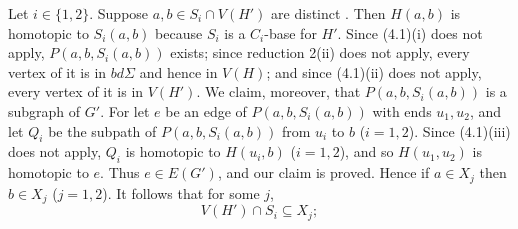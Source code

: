 Let $i \in \{1, 2\}$. Suppose $a, b \in S_i \cap V(H')$ are distinct . Then $H(a, b)$ is homotopic to $S_i(a, b)$ because $S_i$ is a $C_i$-base for $H'$. Since (4.1)(i) does not apply, $P(a, b, S_i(a, b))$ exists; since reduction 2(ii) does not apply, every vertex of it is in $bd\Sigma$ and hence in $V(H)$; and since (4.1)(ii) does not apply, every vertex of it is in $V(H')$. We claim, moreover, that $P(a, b, S_i(a, b))$ is a subgraph of $G'$. For let $e$ be an edge of $P(a, b, S_i(a, b))$ with ends $u_1, u_2$, and let $Q_i$ be the subpath of $P(a, b, S_i(a, b))$ from $u_i$ to $b$ ($i = 1, 2$). Since (4.1)(iii) does not apply, $Q_i$ is homotopic to $H(u_i, b)$ ($i = 1, 2$), and so $H(u_1, u_2)$ is homotopic to $e$. Thus $e \in E(G')$, and our claim is proved. Hence if $a \in X_j$ then $b \in X_j$ ($j = 1, 2$).  It follows that for some $j$,
\begin{equation*}
V(H') \cap S_i \subseteq X_j;
\end{equation*}
